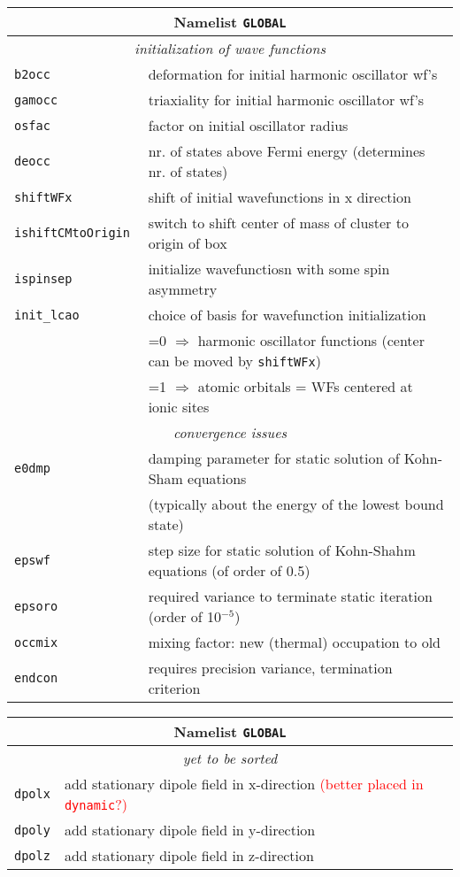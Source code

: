 \documentclass[12pt]{article}
\begin{document}
\begin{tabular}{ll}
\hline
\multicolumn{2}{c}{Namelist {\tt GLOBAL}} in {\tt for005.<name>} \\
\hline
\multicolumn{2}{c}{\it initialization of wave functions} \\
\hline
{\tt b2occ            }& deformation for initial harmonic oscillator wf's\\
{\tt gamocc           }& triaxiality for initial harmonic oscillator wf's\\
{\tt osfac} & factor on initial oscillator radius  \\
{\tt deocc            }& nr. of states above Fermi energy (determines nr. of
states)\\
{\tt shiftWFx         }& shift of initial wavefunctions in x direction \\
{\tt ishiftCMtoOrigin }& switch to shift center of mass of cluster to
origin of box\\
{\tt ispinsep         }& initialize wavefunctiosn with some spin asymmetry\\
{\tt init\_lcao       }& choice of basis for wavefunction initialization \\
& =0 $\Longrightarrow$ harmonic oscillator functions (center can be
moved
  by {\tt shiftWFx})
\\
& =1 $\Longrightarrow$ atomic orbitals = WFs centered at ionic sites
\\
\hline
\multicolumn{2}{c}{\it convergence issues} \\
\hline
{\tt e0dmp            }& damping parameter for static solution of Kohn-Sham equations\\
& (typically about the energy of the lowest bound state)\\
{\tt epswf            }& step size for static solution of Kohn-Shahm
equations (of order of 0.5)\\
{\tt epsoro           }& required variance to terminate static iteration (order of 10$^{-5}$)\\
{\tt occmix} &  mixing factor: new (thermal) occupation to old \\
{\tt endcon} &  requires precision variance, termination criterion \\
\hline
\end{tabular}

\begin{tabular}{ll}
\hline
\multicolumn{2}{c}{Namelist {\tt GLOBAL}} in {\tt for005.<name>} \\
\hline
\multicolumn{2}{c}{\it yet to be sorted} \\
\hline
{\tt dpolx} & add stationary dipole field in x-direction
\textcolor{red}{(better placed in {\tt dynamic}?)}\\
{\tt dpoly} & add stationary dipole field in y-direction    \\
{\tt dpolz} & add stationary dipole field in z-direction    \\
\hline
\end{tabular}
\end{document}
